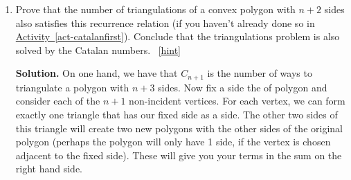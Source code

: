 \documentclass{book}
\begin{document}
\begin{activity}[]
\begin{enumerate}[font=\bfseries,label=(\alph*),ref=\alph*]
\item\label{task-194} \hypertarget{p-1081}{}%
Prove that the number of triangulations of a convex polygon with \(n+2\) sides also satisfies this recurrence relation (if you haven't already done so in \hyperref[act-catalanfirst]{Activity~\ref{act-catalanfirst}}).  Conclude that the triangulations problem is also solved by the Catalan numbers.%
~\hfill{\tiny\hyperlink{a-181.c}{[hint]}\hypertarget{q-181.c}{}}\par\smallskip%
\noindent\textbf{Solution.}\hypertarget{solution-113}{}\quad%
\hypertarget{p-1083}{}%
On one hand, we have that \(C_{n+1}\) is the number of ways to triangulate a polygon with \(n+3\) sides.  Now fix a side the of polygon and consider each of the \(n+1\) non-incident vertices.  For each vertex, we can form exactly one triangle that has our fixed side as a side.  The other two sides of this triangle will create two new polygons with the other sides of the original polygon (perhaps the polygon will only have 1 side, if the vertex is chosen adjacent to the fixed side).  These will give you your terms in the sum on the right hand side.%
\end{enumerate}
\end{activity}
\end{document}
